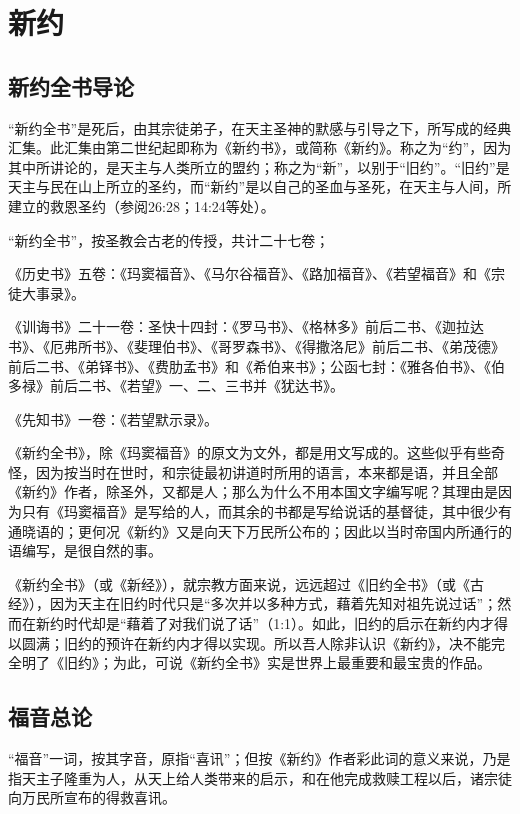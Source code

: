 \part{新约}


\chapter*{新约全书导论}
“新约全书”是\UL[耶稣]死后，由其宗徒弟子，在天主圣神的默感与引导之下，所写成的经典汇集。此汇集由第二世纪起即称为《新约书》，或简称《新约》。称之为“约”，因为其中所讲论的，是天主与人类所立的盟约；称之为“新”，以别于“旧约”。“旧约”是天主与\UL[以]民在\UL[西乃]山上所立的圣约，而“新约”是\UL[基督]以自己的圣血与圣死，在天主与人间，所建立的救恩圣约（参阅26:28；14:24等处）。

“新约全书”，按圣教会古老的传授，共计二十七卷；

《历史书》五卷：《玛窦福音》、《马尔谷福音》、《路加福音》、《若望福音》和《宗徒大事录》。

《训诲书》二十一卷：圣\UL[保禄]快十四封：《罗马书》、《格林多》前后二书、《迦拉达书》、《厄弗所书》、《斐理伯书》、《哥罗森书》、《得撒洛尼》前后二书、《弟茂德》前后二书、《弟铎书》、《费肋孟书》和《希伯来书》；公函七封：《雅各伯书》、《伯多禄》前后二书、《若望》一、二、三书并《犹达书》。

《先知书》一卷：《若望默示录》。

《新约全书》，除《玛窦福音》的原文为\UL[阿刺美]文外，都是用\UL[希腊]文写成的。这些似乎有些奇怪，因为按当时\UL[耶稣]在世时，和宗徒最初讲道时所用的语言，本来都是\UL[阿刺美]语，并且全部《新约》作者，除圣\UL[路加]外，又都是\UL[犹太]人；那么为什么不用本国文字编写呢？其理由是因为只有《玛窦福音》是写给\UL[巴力斯坦]的\UL[犹太]人，而其余的书都是写给说\UL[希腊]话的基督徒，其中很少有通晓\UL[阿刺美]语的；更何况《新约》又是向天下万民所公布的；因此以当时\UL[罗马]帝国内所通行的\UL[希腊]语编写，是很自然的事。

《新约全书》（或《新经》），就宗教方面来说，远远超过《旧约全书》（或《古经》），因为天主在旧约时代只是“多次并以多种方式，藉着先知对祖先说过话”；然而在新约时代却是“藉着了对我们说了话”（1:1）。如此，旧约的启示在新约内才得以圆满；旧约的预许在新约内才得以实现。所以吾人除非认识《新约》，决不能完全明了《旧约》；为此，可说《新约全书》实是世界上最重要和最宝贵的作品。


\chapter*{福音总论}
“福音”一词，按其字音，原指“喜讯”；但按《新约》作者彩此词的意义来说，乃是指天主子\UL[耶稣]隆重为人，从天上给人类带来的启示，和在他完成救赎工程以后，诸宗徒向万民所宣布的得救喜讯。


